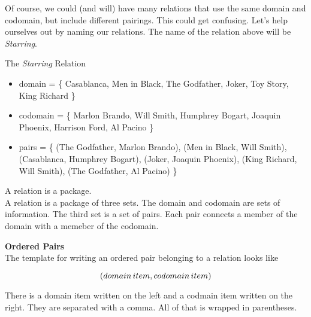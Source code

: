 \documentclass{ximera}
\begin{document}
Of course, we could (and will) have many relations that use the same domain and codomain, but include different pairings. This could get confusing.  Let's help ourselves out by naming our relations.  The name of the relation above will be \textit{Starring}.


\begin{example} The \textit{Starring} Relation\\
\begin{itemize}
\item domain = \{ Casablanca, Men in Black,  The Godfather, Joker, Toy Story, King Richard \}  
\item codomain = \{ Marlon Brando, Will Smith, Humphrey Bogart, Joaquin Phoenix, Harrison Ford, Al Pacino  \} 
\item pairs = \{ (The Godfather, Marlon Brando), (Men in Black, Will Smith), (Casablanca, Humphrey Bogart), (Joker, Joaquin Phoenix), (King Richard, Will Smith), (The Godfather, Al Pacino) \} 
\end{itemize}
\end{example}


A relation is a package.  \\

A relation is a package of three sets. The domain and codomain are sets of information.  The third set is a set of pairs.  Each pair connects a member of the domain with a memeber of the codomain. 


\begin{template} \textbf{\textcolor{purple!85!blue}{Ordered Pairs}}  \\
The template for writing an ordered pair belonging to a relation looks like  

\[
\large{( domain \, item, codomain \, item )}
\]
\end{template}

There is a domain item written on the left and a codmain item written on the right.  They are separated with a comma.  All of that is wrapped in parentheses.
\end{document}
